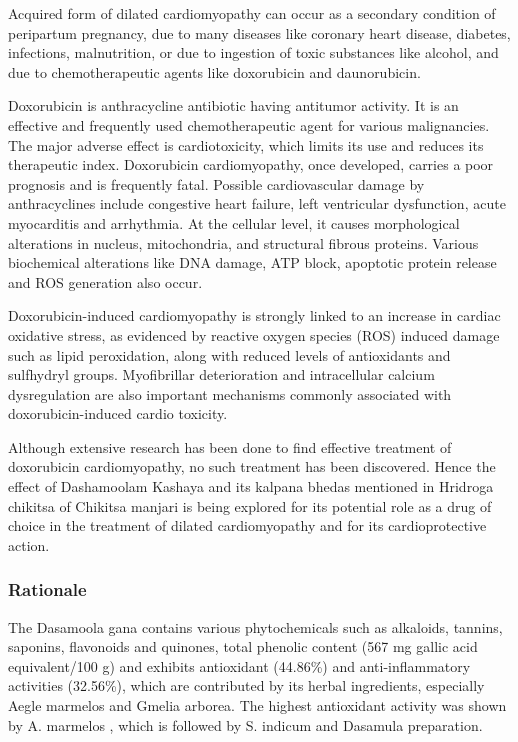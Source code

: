 \documentclass[11pt]{article} %
\begin{document}
Acquired form of dilated cardiomyopathy can occur as a secondary condition of peripartum
pregnancy, due to many diseases like coronary heart disease, diabetes, infections, malnutrition, or due to ingestion of toxic substances like alcohol, and due to chemotherapeutic agents like doxorubicin and daunorubicin.

Doxorubicin is anthracycline antibiotic having antitumor activity. It is an effective and
frequently used chemotherapeutic agent for various malignancies. The major adverse effect is
cardiotoxicity, which limits its use and reduces its therapeutic index. Doxorubicin
cardiomyopathy, once developed, carries a poor prognosis and is frequently fatal. Possible
cardiovascular damage by anthracyclines include congestive heart failure, left ventricular
dysfunction, acute myocarditis and arrhythmia. At the cellular level, it causes morphological
alterations in nucleus, mitochondria, and structural fibrous proteins. Various biochemical
alterations like DNA damage, ATP block, apoptotic protein release and ROS generation also
occur.

Doxorubicin-induced cardiomyopathy is strongly linked to an increase in cardiac oxidative
stress, as evidenced by reactive oxygen species (ROS) induced damage such as lipid
peroxidation, along with reduced levels of antioxidants and sulfhydryl groups. Myofibrillar
deterioration and intracellular calcium dysregulation are also important mechanisms commonly
associated with doxorubicin-induced cardio toxicity.

Although extensive research has been done to find effective treatment of doxorubicin
cardiomyopathy, no such treatment has been discovered. Hence the effect of Dashamoolam
Kashaya and its kalpana bhedas mentioned in Hridroga chikitsa of Chikitsa manjari is being
explored for its potential role as a drug of choice in the treatment of dilated cardiomyopathy and for its cardioprotective action.

\subsubsection{Rationale}
\label{subsubsec:RATIONALE}

The Dasamoola gana contains various phytochemicals such as alkaloids, tannins, saponins,
flavonoids and quinones, total phenolic content (567 mg gallic acid equivalent/100 g) and
exhibits antioxidant (44.86\%) and anti-inflammatory activities (32.56\%), which are contributed by its herbal ingredients, especially Aegle marmelos and Gmelia arborea. The highest antioxidant activity was shown by A. marmelos , which is followed by S. indicum and Dasamula preparation. \cite{Mahadevan2016}
\end{document}
